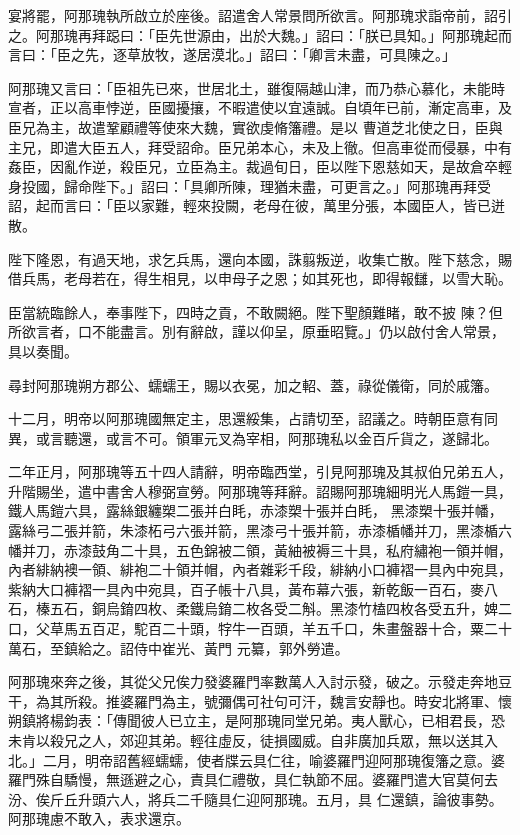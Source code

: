 \begin{pinyinscope}
 宴將罷，阿那瑰執所啟立於座後。詔遣舍人常景問所欲言。阿那瑰求詣帝前，詔引之。阿那瑰再拜跽曰：「臣先世源由，出於大魏。」詔曰：「朕已具知。」阿那瑰起而言曰：「臣之先，逐草放牧，遂居漠北。」詔曰：「卿言未盡，可具陳之。」



 阿那瑰又言曰：「臣祖先已來，世居北土，雖復隔越山津，而乃恭心慕化，未能時宣者，正以高車悖逆，臣國擾攘，不暇遣使以宜遠誠。自頃年已前，漸定高車，及臣兄為主，故遣鞏顧禮等使來大魏，實欲虔脩籓禮。是以
 曹道芝北使之日，臣與主兄，即遣大臣五人，拜受詔命。臣兄弟本心，未及上徹。但高車從而侵暴，中有姦臣，因亂作逆，殺臣兄，立臣為主。裁過旬日，臣以陛下恩慈如天，是故倉卒輕身投國，歸命陛下。」詔曰：「具卿所陳，理猶未盡，可更言之。」阿那瑰再拜受詔，起而言曰：「臣以家難，輕來投闕，老母在彼，萬里分張，本國臣人，皆已迸散。



 陛下隆恩，有過天地，求乞兵馬，還向本國，誅翦叛逆，收集亡散。陛下慈念，賜借兵馬，老母若在，得生相見，以申母子之恩；如其死也，即得報讎，以雪大恥。



 臣當統臨餘人，奉事陛下，四時之貢，不敢闕絕。陛下聖顏難睹，敢不披
 陳？但所欲言者，口不能盡言。別有辭啟，謹以仰呈，原垂昭覽。」仍以啟付舍人常景，具以奏聞。



 尋封阿那瑰朔方郡公、蠕蠕王，賜以衣冕，加之軺、蓋，祿從儀衛，同於戚籓。



 十二月，明帝以阿那瑰國無定主，思還綏集，占請切至，詔議之。時朝臣意有同異，或言聽還，或言不可。領軍元叉為宰相，阿那瑰私以金百斤貨之，遂歸北。



 二年正月，阿那瑰等五十四人請辭，明帝臨西堂，引見阿那瑰及其叔伯兄弟五人，升階賜坐，遣中書舍人穆弼宣勞。阿那瑰等拜辭。詔賜阿那瑰細明光人馬鎧一具，鐵人馬鎧六具，露絲銀纏槊二張并白眊，赤漆槊十張并白眊，
 黑漆槊十張并幡，露絲弓二張并箭，朱漆柘弓六張并箭，黑漆弓十張并箭，赤漆楯幡并刀，黑漆楯六幡并刀，赤漆鼓角二十具，五色錦被二領，黃紬被褥三十具，私府繡袍一領并帽，內者緋納襖一領、緋袍二十領并帽，內者雜彩千段，緋納小口褲褶一具內中宛具，紫納大口褲褶一具內中宛具，百子帳十八具，黃布幕六張，新乾飯一百石，麥八石，榛五石，銅烏錥四枚、柔鐵烏錥二枚各受二斛。黑漆竹榼四枚各受五升，婢二口，父草馬五百疋，駝百二十頭，牸牛一百頭，羊五千口，朱畫盤器十合，粟二十萬石，至鎮給之。詔侍中崔光、黃門
 元纂，郭外勞遣。



 阿那瑰來奔之後，其從父兄俟力發婆羅門率數萬人入討示發，破之。示發走奔地豆干，為其所殺。推婆羅門為主，號彌偶可社句可汗，魏言安靜也。時安北將軍、懷朔鎮將楊鈞表：「傳聞彼人已立主，是阿那瑰同堂兄弟。夷人獸心，已相君長，恐未肯以殺兄之人，郊迎其弟。輕往虛反，徒損國威。自非廣加兵眾，無以送其入北。」二月，明帝詔舊經蠕蠕，使者牒云具仁往，喻婆羅門迎阿那瑰復籓之意。婆羅門殊自驕慢，無遜避之心，責具仁禮敬，具仁執節不屈。婆羅門遣大官莫何去汾、俟斤丘升頭六人，將兵二千隨具仁迎阿那瑰。五月，具
 仁還鎮，論彼事勢。阿那瑰慮不敢入，表求還京。




\end{pinyinscope}
